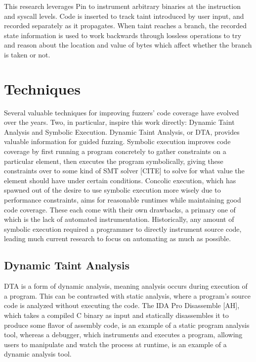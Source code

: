 \documentclass[11pt,expanded,copyright]{fsuthesis}
\begin{document}
This research leverages Pin to instrument arbitrary binaries at the instruction and syscall levels. Code is inserted to track taint introduced by user input, and recorded separately as it propagates. When taint reaches a branch, the recorded state information is used to work backwards through lossless operations to try and reason about the location and value of bytes which affect whether the branch is taken or not.

\section{Techniques}

Several valuable techniques for improving fuzzers' code coverage have evolved over the years. Two, in particular, inspire this work directly: Dynamic Taint Analysis and Symbolic Execution. Dynamic Taint Analysis, or DTA, provides valuable information for guided fuzzing. Symbolic execution improves code coverage by first running a program concretely to gather constraints on a particular element, then executes the program symbolically, giving these constraints over to some kind of SMT solver [CITE] to solve for what value the element should have under certain conditions. Concolic execution, which has spawned out of the desire to use symbolic execution more wisely due to performance constraints, aims for reasonable runtimes while maintaining good code coverage. These each come with their own drawbacks, a primary one of which is the lack of automated instrumentation. Historically, any amount of symbolic execution required a programmer to directly instrument source code, leading much current research to focus on automating as much as possible.

\subsection{Dynamic Taint Analysis}

DTA is a form of dynamic analysis, meaning analysis occurs during execution of a program. This can be contrasted with static analysis, where a program's source code is analyzed without executing the code. The IDA Pro Disassemble [AH], which takes a compiled C binary as input and statically disassembles it to produce some flavor of assembly code, is an example of a static program analysis tool, whereas a debugger, which instruments and executes a program, allowing users to manipulate and watch the process at runtime, is an example of a dynamic analysis tool.
\end{document}
